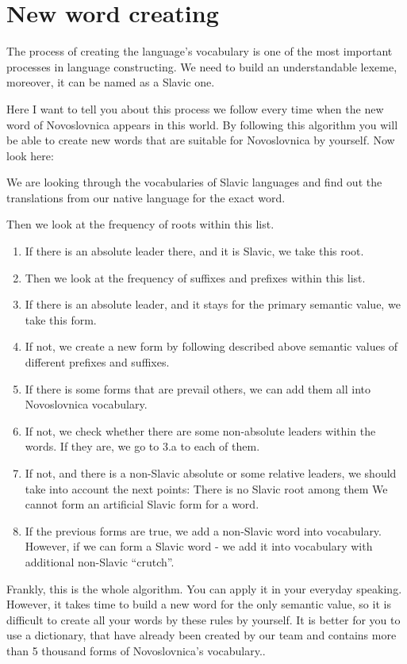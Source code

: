 \section{New word creating}

The process of creating the language’s vocabulary is one of the most important processes in language constructing. We need to build an understandable lexeme, moreover, it can be named as a Slavic one. 

Here I want to tell you about this process we follow every time when the new word of Novoslovnica appears in this world. By following this algorithm you will be able to create new words that are suitable for Novoslovnica by yourself. Now look here:

We are looking through the vocabularies of Slavic languages and find out the translations from our native language for the exact word.

Then we look at the frequency of roots within this list.
\begin{enumerate}
	\item If there is an absolute leader there, and it is Slavic, we take this root.
	\item Then we look at the frequency of suffixes and prefixes within this list.
	\item If there is an absolute leader, and it stays for the primary semantic value, we take this form.
	\item If not, we create a new form by following described above semantic values of different prefixes and suffixes.
	\item If there is some forms that are prevail others, we can add them all into Novoslovnica vocabulary.
	\item If not, we check whether there are some non-absolute leaders within the words. If they are, we go to 3.a to each of them.
	\item If not, and there is a non-Slavic absolute or some relative leaders, we should take into account the next points:
	\subitem There is no Slavic root among them
	\subitem We cannot form an artificial Slavic form for a word.
	\item If the previous forms are true, we add a non-Slavic word into vocabulary. However, if we can form a Slavic word - we add it into vocabulary with additional non-Slavic “crutch”. 
\end{enumerate}

Frankly, this is the whole algorithm. You can apply it in your everyday speaking. However, it takes time to build a new word for the only semantic value, so it is difficult to create all your words by these rules by yourself. It is better for you to use a dictionary, that have already been created by our team and contains more than 5 thousand forms of Novoslovnica’s vocabulary.. 